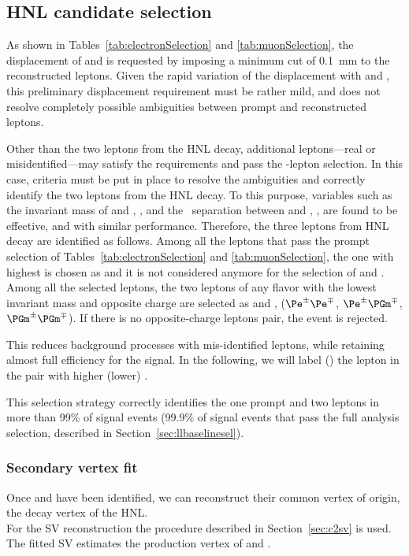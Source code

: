 \subsection{HNL candidate selection}
As shown in Tables~\ref{tab:electronSelection} and
\ref{tab:muonSelection},
the displacement of \ltwo and \lthree is requested by imposing a
minimum \absdxy cut of 0.1~mm to the reconstructed leptons.
Given the rapid variation of the \hnl displacement with \mhnl and
\mixpar, this preliminary displacement requirement must be rather
mild, and does not resolve completely possible ambiguities between
prompt and \displ reconstructed leptons.

Other than the two leptons from the HNL decay, additional
leptons---real or misidentified---may satisfy the \absdxy requirements
and pass the \displ-lepton selection. In this case, criteria must
be put in place to resolve the ambiguities and correctly identify the
two leptons from the HNL decay.
To this purpose, variables such as the invariant mass of \ltwo and
\lthree, \mtwol, and the \DR\ separation between \ltwo and \lthree, \DRtwol, are found to be
effective, and with similar performance.
Therefore, the three leptons from HNL decay are identified as follows.
Among all the leptons that pass the prompt selection of
Tables~\ref{tab:electronSelection} and \ref{tab:muonSelection}, the one
with highest \pt is chosen as \lone and it is not considered anymore for the selection of \ltwo and \lthree.
Among all the selected \displ leptons, the two leptons of any
flavor with the lowest invariant mass and opposite charge are selected
as \ltwo and \lthree,
($\Pe^\pm\Pe^\mp$, $\Pe^\pm\PGm^\mp$, $\PGm^\pm\PGm^\mp$).
If there is no opposite-charge \displ leptons pair, the
event is rejected. 

This reduces background processes with
mis-identified leptons, while retaining almost full efficiency for the
signal. In the following, we will label \ltwo (\lthree) the lepton in
the pair with higher (lower) \pt.

This selection strategy correctly identifies the one prompt and two
\displ leptons in more than 99\% of signal events (99.9\% of
signal events that pass the full analysis selection, described in
Section~\ref{sec:llbaselinesel}).

\subsubsection{Secondary vertex fit}

Once \ltwo and \lthree have been identified, we can reconstruct their
common vertex of origin, \ie the decay vertex of the HNL. \\
For the SV reconstruction the procedure described in Section~\ref{sec:c2sv} is used.
The fitted SV estimates the production vertex of \ltwo and \lthree.

